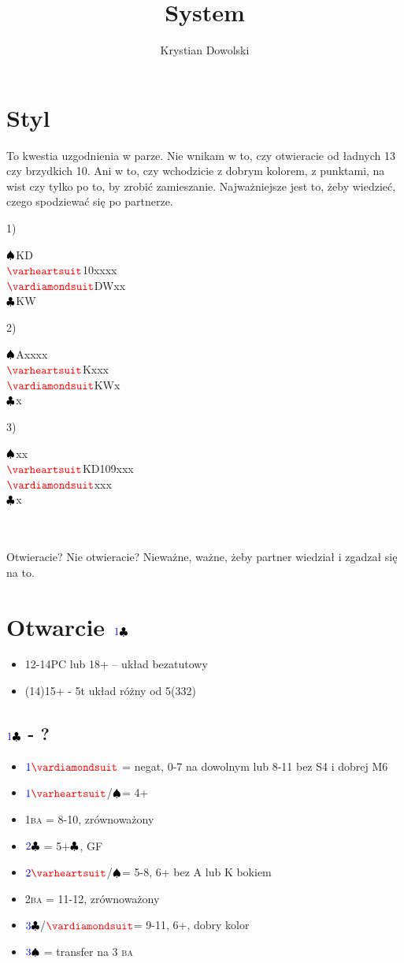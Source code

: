 \documentclass[12pt]{article}
\title{System}
\author{Krystian Dowolski}
\newcommand*\Hs[1][]{\ensuremath{{\color{blue} #1}{\color{red}\varheartsuit}}}
\newcommand*\Ss[1][]{\ensuremath{{\color{blue} #1}{\color{black}\spadesuit}}}
\newcommand*\Ds[1][]{\ensuremath{{\color{blue} #1}{\color{red}\vardiamondsuit}}}
\newcommand*\Cs[1][]{\ensuremath{{\color{blue} #1}{\color{black}\clubsuit}}}
\newcommand*\NT[1][]{{\color{blue} #1}{\color{black}\textsc{ba}}}
\newcommand*\Hand[4]{\Ss#1\\\Hs#2\\\Ds#3\\\Cs#4\\}
\begin{document}
\tableofcontents
\newpage

\section{Styl}
To kwestia uzgodnienia w parze. Nie wnikam w to, czy otwieracie od ładnych 13 czy brzydkich 10. Ani w to, czy wchodzicie z dobrym kolorem, z punktami, na wist czy tylko po to, by zrobić zamieszanie. Najważniejsze jest to, żeby wiedzieć, czego spodziewać się po partnerze.

\vspace*{0.7cm}
1)
\begin{minipage}[t]{0.30\textwidth}
    \Hand{KD}{10xxxx}{DWxx}{KW}
\end{minipage}%
2)
\begin{minipage}[t]{0.30\textwidth}
    \Hand{Axxxx}{Kxxx}{KWx}{x}
\end{minipage}%
3)
\begin{minipage}[t]{0.30\textwidth}
    \Hand{xx}{KD109xxx}{xxx}{x}
\end{minipage}%
\\\\
Otwieracie? Nie otwieracie? Nieważne, ważne, żeby partner wiedział i zgadzał się na to.
\newpage
\section{Otwarcie \Cs[1]}
\begin{itemize}
    \item 12-14PC lub 18+ – układ bezatutowy
    \item (14)15+  - 5t układ różny od 5(332)
\end{itemize}
\subsection{\Cs[1] - ?}
\begin{itemize}
    \item \Ds[1] = negat, 0-7 na dowolnym lub 8-11 bez S4 i dobrej M6
    \item \Hs[1]/\Ss = 4+
    \item \NT[1] = 8-10, zrównoważony
    \item \Cs[2] = 5+\Cs, GF
    \item \Hs[2]/\Ss = 5-8, 6+ bez A lub K bokiem
    \item \NT[2] = 11-12, zrównoważony
    \item \Cs[3]/\Ds = 9-11, 6+, dobry kolor
    \item \Ss[3] = transfer na 3\NT
\end{itemize}
\newpage
\end{document}
